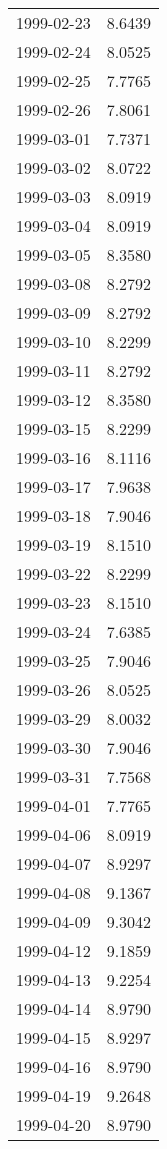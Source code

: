 \begin{tabular}{lr}
1999-02-23 &      8.6439 \\
1999-02-24 &      8.0525 \\
1999-02-25 &      7.7765 \\
1999-02-26 &      7.8061 \\
1999-03-01 &      7.7371 \\
1999-03-02 &      8.0722 \\
1999-03-03 &      8.0919 \\
1999-03-04 &      8.0919 \\
1999-03-05 &      8.3580 \\
1999-03-08 &      8.2792 \\
1999-03-09 &      8.2792 \\
1999-03-10 &      8.2299 \\
1999-03-11 &      8.2792 \\
1999-03-12 &      8.3580 \\
1999-03-15 &      8.2299 \\
1999-03-16 &      8.1116 \\
1999-03-17 &      7.9638 \\
1999-03-18 &      7.9046 \\
1999-03-19 &      8.1510 \\
1999-03-22 &      8.2299 \\
1999-03-23 &      8.1510 \\
1999-03-24 &      7.6385 \\
1999-03-25 &      7.9046 \\
1999-03-26 &      8.0525 \\
1999-03-29 &      8.0032 \\
1999-03-30 &      7.9046 \\
1999-03-31 &      7.7568 \\
1999-04-01 &      7.7765 \\
1999-04-06 &      8.0919 \\
1999-04-07 &      8.9297 \\
1999-04-08 &      9.1367 \\
1999-04-09 &      9.3042 \\
1999-04-12 &      9.1859 \\
1999-04-13 &      9.2254 \\
1999-04-14 &      8.9790 \\
1999-04-15 &      8.9297 \\
1999-04-16 &      8.9790 \\
1999-04-19 &      9.2648 \\
1999-04-20 &      8.9790 \\

\end{tabular}
